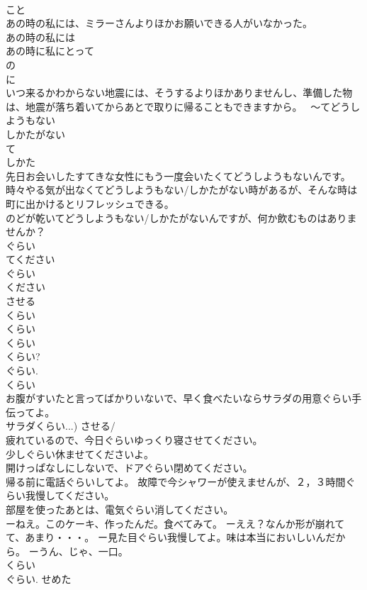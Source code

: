 \documentclass[8pt]{extreport}
\begin{document}
\begin{CJK}{UTF8}{min}
\\	こと 
\\	あの時の私には、ミラーさんよりほかお願いできる人がいなかった。 
\\	あの時の私には
\\	あの時に私にとって　
\\	の
\\	に
\\	いつ来るかわからない地震には、そうするよりほかありませんし、準備した物は、地震が落ち着いてからあとで取りに帰ることもできますから。　 ～てどうしようもない 
\\	しかたがない 
\\	て 
\\	しかた 
\\	先日お会いしたすてきな女性にもう一度会いたくてどうしようもないんです。 時々やる気が出なくてどうしようもない/しかたがない時があるが、そんな時は町に出かけるとリフレッシュできる。 
\\	のどが乾いてどうしようもない/しかたがないんですが、何か飲むものはありませんか？ 
\\	ぐらい
\\	てください	
\\	ぐらい
\\	ください 
\\	させる 
\\	くらい
\\	くらい
\\	くらい
\\	くらい? 
\\	ぐらい. 
\\	くらい
\\	お腹がすいたと言ってばかりいないで、早く食べたいならサラダの用意ぐらい手伝ってよ。 
\\	サラダくらい...) させる/
\\	疲れているので、今日ぐらいゆっくり寝させてください。 
\\	少しぐらい休ませてくださいよ。 
\\	開けっぱなしにしないで、ドアぐらい閉めてください。 
\\	帰る前に電話ぐらいしてよ。 故障で今シャワーが使えませんが、２，３時間ぐらい我慢してください。 
\\	部屋を使ったあとは、電気ぐらい消してください。 
\\	ーねえ。このケーキ、作ったんだ。食べてみて。 ーええ？なんか形が崩れてて、あまり・・・。 ー見た目ぐらい我慢してよ。味は本当においしいんだから。 ーうん、じゃ、一口。 
\\	くらい 
\\	ぐらい. せめた

\end{CJK}
\end{document}

